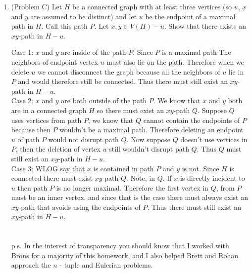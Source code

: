 \documentclass{amsart}
\begin{document}
\begin{enumerate}
	
	\vspace{0.25in}

\item (Problem C) Let $H$ be a connected graph with at least three vertices (so $u$, $x$ and $y$ are assumed to be distinct) and let $u$ be the endpoint of a maximal path in $H.$ Call this path $P.$ Let $x,y \in V(H)-u.$ Show that there exists an $xy$-path in $H-u.$

Case 1: $x$ and $y$ are inside of the path $P$. Since $P$ is a maximal path The neighbors of endpoint vertex $u$ must also lie on the path. Therefore when we delete $u$ we cannot disconnect the graph because all the neighbors of $u$ lie in $P$ and would therefore still be connected. Thus there must still exist an $xy$-path in $H-u.$ \\

Case 2: $x$ and $y$ are both outside of the path $P$. We know that $x$ and $y$ both are in a connected graph $H$ so there must exist an $xy$-path $Q$. Suppose $Q$ uses vertices from path $P$, we know that $Q$ cannot contain the endpoints of $P$ because then $P$ wouldn't be a maximal path. Therefore deleting an endpoint $u$ of path $P$ would not disrupt path $Q$. Now suppose $Q$ doesn't use vertices in $P$, then the deletion of vertex $u$ still wouldn't disrupt path $Q$. Thus $Q$ must still exist an $xy$-path in $H-u.$\\


Case 3: WLOG say that $x$ is contained in path $P$ and $y$ is not. Since $H$ is connected there must exist  $xy$-path $Q$. Note, in $Q$, If $x$ is directly incident to $u$ then path $P$ is no longer maximal. Therefore the first vertex in $Q$, from $P$ must be an inner vertex. and since that is the case there must always exist an $xy$-path that avoids using the endpoints of $P$. Thus there must still exist an $xy$-path in $H-u.$ \\\\\\


p.s. In the interest of transparency you should know that I worked with Brons for a majority of this homework, and I also helped Brett and Rohan approach the $n$ - tuple and Eulerian problems. 
\end{enumerate}
\end{document}
